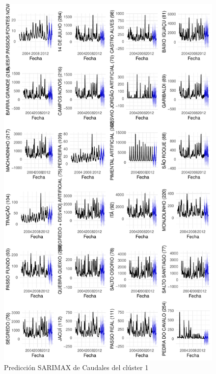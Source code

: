 \documentclass[12pt,oneside]{book}\usepackage[]{graphicx}\usepackage[]{color}
\makeatletter
\def\maxwidth{ %
  \ifdim\Gin@nat@width>\linewidth
    \linewidth
  \else
    \Gin@nat@width
  \fi
}
\newenvironment{knitrout}{}{} %
\theoremstyle{definition} %
\makeatother
\begin{document}
\begin{knitrout}
\color{fgcolor}\begin{figure}[h]

{\centering \includegraphics[width=\maxwidth,height=0.85\textheight]{figure/unnamed-chunk-99-1} 

}

\caption{\label{fig:pred_clx1} Predicción SARIMAX de Caudales del clúster 1}\label{fig:unnamed-chunk-99}
\end{figure}


\end{knitrout}
\end{document}
